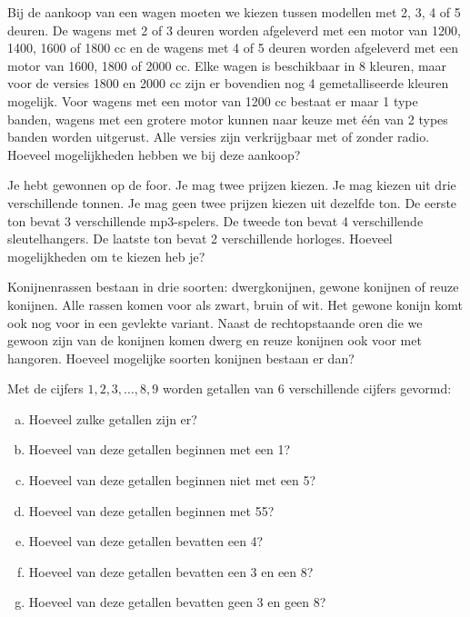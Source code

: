 \documentclass[12pt,twoside]{article}
\begin{document}
\begin{oefening}
Bij de aankoop van een wagen moeten we kiezen tussen modellen met 2, 3, 4 of 5 deuren. De wagens met 2 of 3 deuren worden afgeleverd met een motor van 1200, 1400, 1600 of 1800 cc en de wagens met 4 of 5 deuren worden afgeleverd met een motor van 1600, 1800 of 2000 cc. Elke wagen is beschikbaar in 8 kleuren, maar voor de versies 1800 en 2000 cc zijn er bovendien nog 4 gemetalliseerde kleuren mogelijk. Voor wagens met een motor van 1200 cc bestaat er maar 1 type banden, wagens met een grotere motor kunnen naar keuze met één van 2 types banden worden uitgerust. Alle versies zijn verkrijgbaar met of zonder radio. Hoeveel mogelijkheden hebben we bij deze aankoop?
\end{oefening}

\begin{oefening}
Je hebt gewonnen op de foor. Je mag twee prijzen kiezen. Je mag kiezen uit drie verschillende tonnen. Je mag geen twee prijzen kiezen uit dezelfde ton. De eerste ton bevat 3 verschillende mp3-spelers. De tweede ton bevat 4 verschillende sleutelhangers. De laatste ton bevat 2 verschillende horloges. Hoeveel mogelijkheden om te kiezen heb je?
\end{oefening}

\begin{oefening}
Konijnenrassen bestaan in drie soorten: dwergkonijnen, gewone konijnen of reuze konijnen. Alle rassen komen voor als zwart, bruin of wit. Het gewone konijn komt ook nog voor in een gevlekte variant. Naast de rechtopstaande oren die we gewoon zijn van de konijnen komen dwerg en reuze konijnen ook voor met hangoren. Hoeveel mogelijke soorten konijnen bestaan er dan?
\end{oefening}

\begin{oefening}
Met de cijfers $1, 2, 3, \ldots , 8, 9$ worden getallen van 6 verschillende cijfers gevormd:
\begin{enumerate}[(a)]
  \item Hoeveel zulke getallen zijn er?
  \item Hoeveel van deze getallen beginnen met een 1?
  \item Hoeveel van deze getallen beginnen niet met een 5?
  \item Hoeveel van deze getallen beginnen met 55?
  \item Hoeveel van deze getallen bevatten een 4?
  \item Hoeveel van deze getallen bevatten een 3 en een 8?
  \item Hoeveel van deze getallen bevatten geen 3 en geen 8?
\end{enumerate}
\end{oefening}
\end{document}
